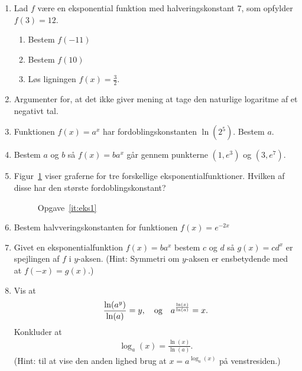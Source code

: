 \begin{enumerate}
	\item Lad $f$ være en eksponential funktion med halveringskonstant $7$, som opfylder $f(3)=12$.
	\begin{enumerate}
		\item Bestem $f(-11)$
		\item Bestem $f(10)$
		\item Løs ligningen $f(x)=\frac{3}{2}$.
	\end{enumerate}
	
	\item Argumenter for, at det ikke giver mening at tage den naturlige logaritme af et negativt tal.
	
	\item Funktionen $f(x)=a^x$ har fordoblingskonstanten $ \ln(2^5) $. Bestem $a$.
	
	
	\item Bestem $a$ og $b$ så $f(x)=ba^x$ går gennem punkterne $(1,e^3)$ og $(3,e^7)$.
	
	\item \label{it:eks1} Figur~\ref{fig:eks1} viser graferne for tre forskellige eksponentialfunktioner. Hvilken af disse har den største fordoblingskonstant?
	
	\begin{figure}
		\centering
		\caption{Opgave~\ref{it:eks1}}
		\label{fig:eks1}
	\end{figure}


	\item Bestem halvveringskonstanten for funktionen $f(x)=e^{-2x}$
	
	
	\item Givet en eksponentialfunktion $f(x)=ba^x$ bestem $c$ og $d$ så $g(x)=cd^x$ er spejlingen af $f$ i $y$-aksen. (Hint: Symmetri om $y$-aksen er ensbetydende med at $f(-x)=g(x)$.)
	
	
	\item \label{it:eks2} Vis at 
	\begin{align*}
	\frac{\ln(a^y)}{\ln(a)}=y,\quad \textup{og}\quad a^{\frac{\ln(x)}{\ln(a)}}=x.
	\end{align*}
	Konkluder at
	\begin{align*}
	\log_a(x)=\frac{\ln(x)}{\ln(a)}.
	\end{align*}
	(Hint: til at vise den anden lighed brug at $ x=a^{\log_a(x)} $ på venstresiden.)
\end{enumerate}